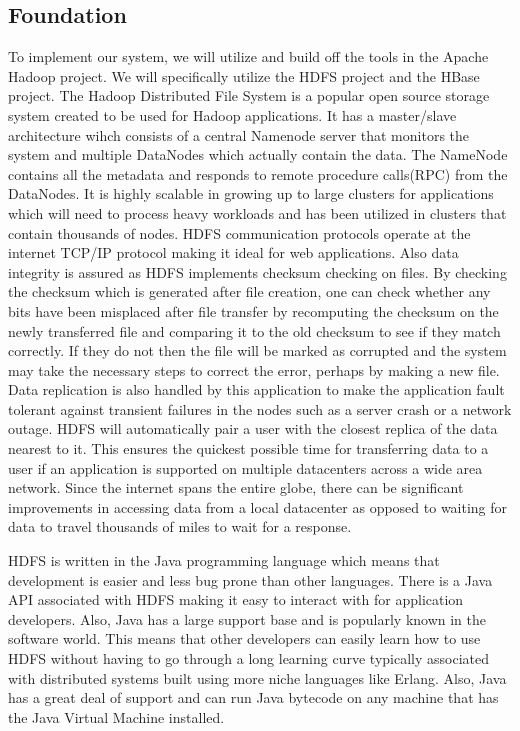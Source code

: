 \documentclass[10pt,final,journal]{IEEEtran}
\begin{document}
\subsection{Foundation}
To implement our system, we will utilize and build off the tools in the Apache Hadoop project. We will specifically utilize the HDFS project and the HBase project. The Hadoop Distributed File System is a popular open source storage system created to be used for Hadoop applications.  It has a master/slave architecture wihch consists of a central Namenode server that monitors the system and multiple DataNodes which actually contain the data.  The NameNode contains all the metadata and responds to remote procedure calls(RPC) from the DataNodes.  It is highly scalable in growing up to large clusters for applications which will need to process heavy workloads and has been utilized in clusters that contain thousands of nodes.  HDFS communication protocols operate at the internet TCP/IP protocol making it ideal for web applications. Also data integrity is assured as HDFS implements checksum checking on files.  By checking the checksum which is generated after file creation, one can check whether any bits have been misplaced after file transfer by recomputing the checksum on the newly transferred file and comparing it to the old checksum to see if they match correctly.  If they do not then the file will be marked as corrupted and the system may take the necessary steps to correct the error, perhaps by making a new file.  Data replication is also handled by this application to make the application fault tolerant against transient failures in the nodes such as a server crash or a network outage.  HDFS will automatically pair a user with the closest replica of the data nearest to it.  This ensures the quickest possible time for transferring data to a user if an application is supported on multiple datacenters across a wide area network.  Since the internet spans the entire globe, there can be significant improvements in accessing data from a local datacenter as opposed to waiting for data to travel thousands of miles to wait for a response.

HDFS is written in the Java programming language which means that development is easier and less bug prone than other languages.  There is a Java API associated with HDFS making it easy to interact with for application developers.  Also, Java has a large support base and is popularly known in the software world.  This means that other developers can easily learn how to use HDFS without having to go through a long learning curve typically associated with distributed systems built using more niche languages like Erlang.  Also, Java has a great deal of support and can run Java bytecode on any machine that has the Java Virtual Machine installed.
\end{document}

